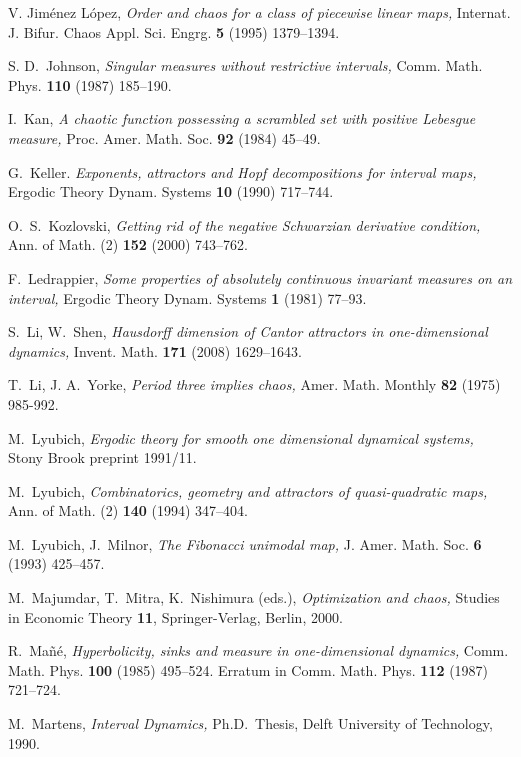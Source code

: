 \documentclass[12pt, psamsfonts, reqno]{amsart}
\begin{document}
\begin{thebibliography}{BKNS}
 V. Jim\'enez L\'opez, {\em Order and chaos for
a class of piecewise linear maps,} Internat. J. Bifur. Chaos Appl.
Sci. Engrg. {\bf 5} (1995) 1379--1394.

 S. D.\ Johnson, {\em Singular measures without
restrictive intervals,}  Comm. Math. Phys. {\bf 110}  (1987)
185--190.

 I.\ Kan, {\em A chaotic function possessing a scrambled set with
positive Lebesgue measure,}  Proc. Amer. Math. Soc. {\bf 92}
(1984) 45--49.

 G.\ Keller.
{\em Exponents, attractors and Hopf decompositions for interval
maps,} Ergodic Theory Dynam. Systems {\bf 10} (1990) 717--744.

 O.\ S.\ Kozlovski,
{\em Getting rid of the negative Schwarzian derivative condition,}
Ann. of Math. (2) {\bf 152} (2000) 743--762.

 F.\ Ledrappier,
{\em Some properties of absolutely continuous invariant measures
on an interval, }  Ergodic Theory Dynam. Systems {\bf 1}  (1981)
77--93.

 S.\ Li, W.\ Shen,
{\em Hausdorff dimension of Cantor attractors in one-dimensional dynamics,}
Invent. Math. {\bf 171} (2008) 1629--1643.

 T.\ Li, J. A.\ Yorke,
{\em Period three implies chaos,} Amer. Math. Monthly {\bf 82}
(1975) 985-992.

 M.\ Lyubich, {\em Ergodic theory for smooth one dimensional
dynamical systems,} Stony Brook preprint 1991/11.

 M.\ Lyubich, {\em Combinatorics, geometry and attractors of
quasi-quadratic maps,} Ann. of Math. (2) {\bf 140} (1994)
347--404.

 M.\ Lyubich, J.\ Milnor,
{\em The Fibonacci unimodal map,} J. Amer. Math. Soc. {\bf 6}
(1993) 425--457.

 M.\ Majumdar, T.\ Mitra, K.\ Nishimura (eds.),
{\em Optimization and chaos,} Studies in Economic Theory {\bf 11},
Springer-Verlag, Berlin, 2000.

 R.\ Ma\~n\'e,
{\em Hyperbolicity, sinks and measure in one-dimensional
dynamics,} Comm. Math. Phys. {\bf 100} (1985) 495--524. Erratum in
Comm. Math. Phys. {\bf 112}  (1987) 721--724.

 M.\ Martens,
{\em Interval Dynamics,} Ph.D.~Thesis, Delft University of
Technology, 1990.


\end{thebibliography}
\end{document}
